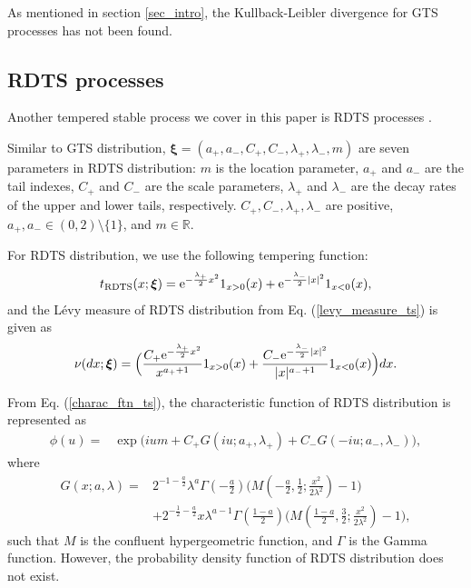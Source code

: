 \documentclass[preprint,11pt]{amsart}
\begin{document}
	As mentioned in section \ref{sec_intro}, the Kullback-Leibler divergence for GTS processes has not been found.
	
\subsection{RDTS processes}
	Another tempered stable process we cover in this paper is RDTS processes \cite{kim2010tempered,rachev2011financial}. 
	
	Similar to GTS distribution, $\boldsymbol{\xi}=(a_+, a_-, C_+, C_-,\lambda_+,\lambda_-,m)$ are seven parameters in RDTS distribution: $m$ is the location parameter, $a_+$ and $a_-$ are the tail indexes, $C_+$ and $C_-$ are the scale parameters, $\lambda_+$ and $\lambda_-$ are the decay rates of the upper and lower tails, respectively. $C_+, C_-, \lambda_+,\lambda_-$ are positive, $a_+, a_-\in(0,2)\setminus \{1\}$, and $m\in\mathbb{R}$.
	
	For RDTS distribution, we use the following tempering function:
	 \begin{align}
	 \label{temp_fns_rdts}
	 	t_{\textrm{RDTS}}(x;\boldsymbol{\xi})={\rm e}^{-\frac{\lambda_{+}}{2}x^2} 1_{x>0}(x)+{\rm e}^{-\frac{\lambda_{-}}{2} |x|^2} 1_{x<0}(x),
	 \end{align}
	and the L\'evy measure of RDTS distribution from Eq. (\ref{levy_measure_ts}) is given \cite{rachev2011financial} as
	\begin{align}
	\label{levy_measure_rdts}
		\nu(dx;\boldsymbol{\xi})=\Big(\frac{C_+{\rm e}^{-\frac{\lambda_+}{2} x^2}}{x^{a_++1}} 1_{x>0}(x)+\frac{C_-{\rm e}^{-\frac{\lambda_-}{2} |x|^2}}{|x|^{a_-+1}} 1_{x<0}(x)\Big)dx.
	\end{align}
	
	From Eq. (\ref{charac_ftn_ts}), the characteristic function of RDTS distribution is represented as
	\begin{align}
	\label{charac_ftn_rdts}
		\phi(u)=&\exp\Big(ium+C_+G(iu;a_+,\lambda_+)+C_-G(-iu;a_-,\lambda_-)\Big),
	\end{align}
	where
	\begin{align}
		G(x;a,\lambda)=&2^{-1-\frac{a}{2}}\lambda^a\Gamma(-\frac{a}{2})\big(M(-\frac{a}{2},\frac{1}{2};\frac{x^2}{2\lambda^2})-1\big)\nonumber\\
		&+2^{-\frac{1}{2}-\frac{a}{2}}x\lambda^{a-1}\Gamma(\frac{1-a}{2})\big(M(\frac{1-a}{2},\frac{3}{2};\frac{x^2}{2\lambda^2})-1\big)\nonumber,
	\end{align}
	such that $M$ is the confluent hypergeometric function, and $\Gamma$ is the Gamma function. However, the probability density function of RDTS distribution does not exist.
		
\end{document}
